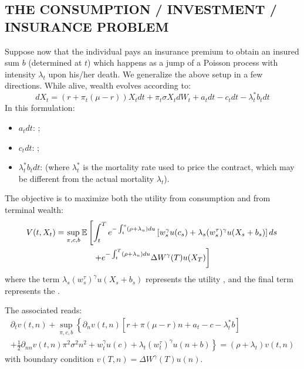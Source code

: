 \subsection*{\color{red}THE CONSUMPTION / INVESTMENT / INSURANCE PROBLEM}

Suppose now that the individual pays an insurance premium to obtain an insured sum $b$ (determined at $t$) which happens as a jump of a Poisson process with intensity $\lambda_t$ upon his/her death. We generalize the above setup in a few directions. While alive, wealth evolves according to:
\begin{equation*}
    dX_t = (r + \pi_t (\mu - r)) X_t dt + \pi_t \sigma X_t dW_t + a_t dt - c_t dt - \lambda_t^* b_t dt
\end{equation*}
In this formulation:
\begin{itemize}
    \item $a_t dt$: ;
    \item $c_t dt$: ;
    \item $\lambda_t^* b_t dt$:  (where $\lambda_t^*$ is the mortality rate used to price the contract, which may be different from the actual mortality $\lambda_t$).
\end{itemize}

The objective is to maximize both the utility from consumption and from terminal wealth:
\begin{multline*}
    V(t, X_t) = \sup_{\pi, c, b} \mathbb E \left[ \int_t^T e^{-\int_t^s (\rho + \lambda_u) du} \left[ w_s^\gamma u(c_s) + \lambda_s (w_s^\tau)^\gamma u(X_s + b_s) \right] ds \right. \\
    \left. + e^{-\int_t^T (\rho + \lambda_u) du} \Delta W^\gamma(T) u(X_T) \right]
\end{multline*}
where the term $\lambda_s (w_s^\tau)^\gamma u(X_s + b_s)$ represents the utility , and the final term represents the .

The associated  reads:
\begin{multline*}
    \partial_t v(t, n) + \sup_{\pi, c, b} \left\{ \partial_n v(t, n) \left[ r + \pi(\mu - r)n + a_t - c - \lambda_t^* b \right] \right. \\
    \left. + \frac{1}{2} \partial_{nn} v(t, n) \pi^2 \sigma^2 n^2 + w_t^\gamma u(c) + \lambda_t (w_t^\tau)^\gamma u(n + b) \right\} = (\rho + \lambda_t) v(t, n)
\end{multline*}
with boundary condition $v(T, n) = \Delta W^\gamma(T) u(n)$.

